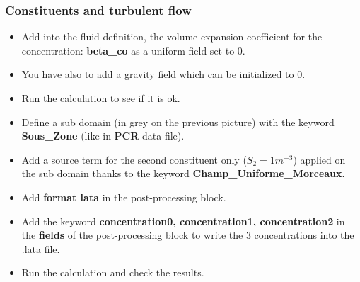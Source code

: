 \documentclass[10pt, hyperref={unicode=true,pdfusetitle, bookmarks=true,bookmarksnumbered=false,bookmarksopen=false, breaklinks=false,pdfborder={0 0 1},backref=true,colorlinks=true,linkcolor=darkblue,pageanchor}]{beamer}
\begin{document}
\begin{frame}
\frametitle{Constituents and turbulent flow}
\begin{block}{}

\begin{itemize}
\item Add into the fluid definition, the volume expansion coefficient for the concentration: \textbf{beta\_co} as a uniform field set to 0.

\item You have also to add a gravity field which can be initialized to 0.

\item Run the calculation to see if it is ok.

\item Define a sub domain (in grey on the previous picture) with the keyword \textbf{Sous\_Zone} (like in \textbf{PCR} data file).

\item Add a source term for the second constituent only ($S_2=1m^{-3}$) applied on the sub domain thanks to the keyword \textbf{Champ\_Uniforme\_Morceaux}.

\item Add \textbf{format lata} in the post-processing block.

\item Add the keyword \textbf{concentration0, concentration1, concentration2} in the \textbf{fields} of the post-processing block to write the 3 concentrations into the .lata file.

\item Run the calculation and check the results.
\end{itemize}

\end{block}
\end{frame}
\end{document}
